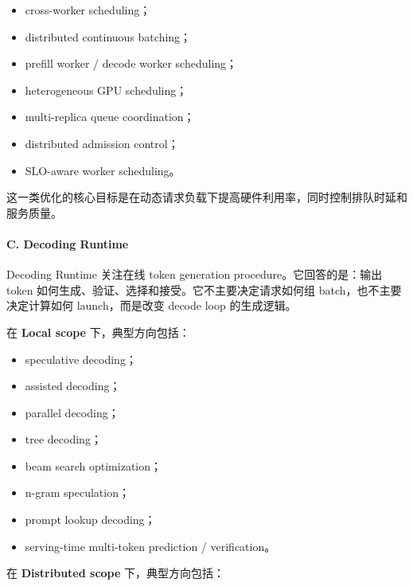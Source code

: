 \documentclass[a4paper,twocolumn,10pt]{ctexart}
\begin{document}
\begin{itemize}
\item cross-worker scheduling；

\item distributed continuous batching；

\item prefill worker / decode worker scheduling；

\item heterogeneous GPU scheduling；

\item multi-replica queue coordination；

\item distributed admission control；

\item SLO-aware worker scheduling。

\end{itemize}
这一类优化的核心目标是在动态请求负载下提高硬件利用率，同时控制排队时延和服务质量。


\paragraph*{C. Decoding Runtime}

Decoding Runtime 关注在线 token generation procedure。它回答的是：输出 token 如何生成、验证、选择和接受。它不主要决定请求如何组 batch，也不主要决定计算如何 launch，而是改变 decode loop 的生成逻辑。


在 \textbf{Local scope} 下，典型方向包括：


\begin{itemize}
\item speculative decoding；

\item assisted decoding；

\item parallel decoding；

\item tree decoding；

\item beam search optimization；

\item n-gram speculation；

\item prompt lookup decoding；

\item serving-time multi-token prediction / verification。

\end{itemize}
在 \textbf{Distributed scope} 下，典型方向包括：
\end{document}
